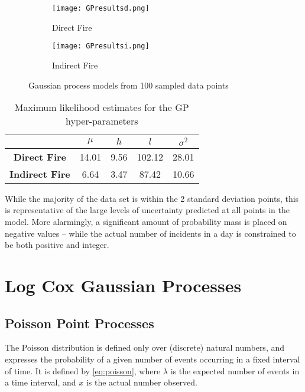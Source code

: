 \documentclass[a4paper,11pt]{report}
\begin{document}
\begin{figure}
\centering
\begin{subfigure}{.5\textwidth}
	\centering
	\texttt{[image: GPresultsd.png]}
  	\caption{Direct Fire}
  	\label{fig:sub1}
\end{subfigure}%
\begin{subfigure}{.5\textwidth}
  	\centering
  	\texttt{[image: GPresultsi.png]}
  	\caption{Indirect Fire}
 	 \label{fig:sub2}
\end{subfigure}
\caption{Gaussian process models from 100 sampled data points}
\label{fig:GPresults}
\end{figure}

\singlespacing
\begin{table}[]
\centering
\caption{Maximum likelihood estimates for the GP hyper-parameters}
\label{GPhyperparameters}
\begin{tabular}{c|c|c|c|c|}
\cline{2-5}
\textbf{}                                    & \(\mu\) & \(h\) & \(l\) & \(\sigma^2\) \\ \hline
\multicolumn{1}{|c|}{\textbf{Direct Fire}}   & 14.01           & 9.56          & 102.12          & 28.01              \\ \hline
\multicolumn{1}{|c|}{\textbf{Indirect Fire}} & 6.64           & 3.47          & 87.42          & 10.66              \\ \hline
\end{tabular}
\end{table}
\doublespacing

While the majority of the data set is within the 2 standard deviation points, this is representative of the large levels of uncertainty predicted at all points in the model. More alarmingly, a significant amount of probability mass is placed on negative values -- while the actual number of incidents in a day is constrained to be both positive and integer. \par 


 


\chapter{Log Cox Gaussian Processes}

\section{Poisson Point Processes}
The Poisson distribution is defined only over (discrete) natural numbers, and expresses the probability of a given number of events occurring in a fixed interval of time. It is defined by \ref{eq:poisson}, where \(\lambda\) is the expected number of events in a time interval, and \(x\) is the actual number observed. \cite{Barber}
\end{document}
